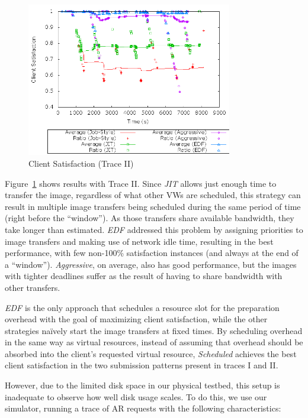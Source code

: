 \begin{figure}
  \begin{center}
    \includegraphics[width=0.8\textwidth]{figures/ClientSatisfaction-ClusteredStartTimes.png}
    \caption{Client Satisfaction (Trace II)}
	\label{fig:clientsatisfactionII}
  \end{center}
\end{figure}

Figure~\ref{fig:clientsatisfactionII} shows results with Trace II. Since \emph{JIT} allows just
enough time to transfer the image, regardless of what other VWs are
scheduled, this strategy can result in multiple image transfers being
scheduled during the same period of time (right before the ``window'').
As those transfers share available bandwidth, they take longer than
estimated. \emph{EDF} addressed this problem by assigning priorities to image
transfers and making use of network idle time, resulting in the best
performance, with few non{}-100\% satisfaction instances (and always at
the end of a ``window''). \emph{Aggressive}, on average, also has
good performance, but the images with tighter deadlines suffer as the
result of having to share bandwidth with other transfers.

\emph{EDF} is the only approach that schedules a resource slot for the preparation overhead with
the goal of maximizing client satisfaction, while the other strategies
na\"ively start the image transfers at fixed times. By scheduling
overhead in the same way as virtual resources, instead of assuming that
overhead should be absorbed into the client's requested virtual
resource, \emph{Scheduled} achieves the best client satisfaction in the
two submission patterns present in traces I and II.

However, due to the limited disk space in our physical testbed, this setup is inadequate to observe how well disk usage scales. To do this, we use our simulator, running a trace of AR requests with the following characteristics:

